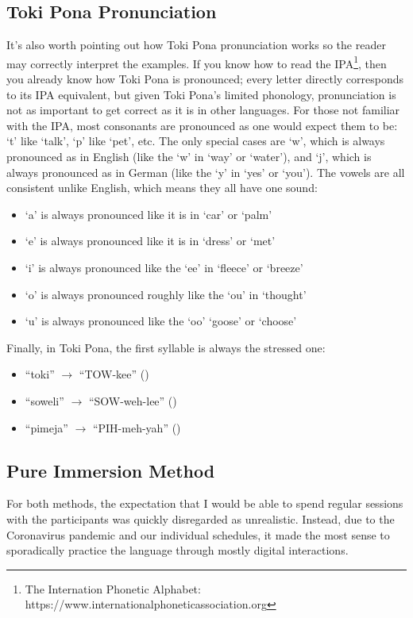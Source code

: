 \documentclass[a4paper,10pt]{article}
\begin{document}
\subsection{Toki Pona Pronunciation}
It's also worth pointing out how Toki Pona pronunciation works so the reader may correctly interpret
the examples. If you know how to read the IPA\footnote{The Internation Phonetic Alphabet:
https://www.internationalphoneticassociation.org}, then you
already know how Toki Pona is pronounced; every letter directly corresponds to its IPA equivalent,
but given Toki Pona's limited phonology, pronunciation is not as important to get correct as it is
in other languages. For those not familiar with the IPA, most consonants are pronounced as one
would expect them to be: `t' like `talk', `p' like `pet', etc. The only special cases are `w', which
is always pronounced as in English (like the `w' in `way' or `water'), and `j', which is always
pronounced as in German (like the `y' in `yes' or `you'). The vowels are all consistent unlike English,
which means they all have one sound:

\begin{itemize}
	\item `a' is always pronounced like it is in `car' or `palm'
	\item `e' is always pronounced like it is in `dress' or `met'
	\item `i' is always pronounced like the `ee' in `fleece' or `breeze'
	\item `o' is always pronounced roughly like the `ou' in `thought'
	\item `u' is always pronounced like the `oo' `goose' or `choose'
\end{itemize}

Finally, in Toki Pona, the first syllable is always the stressed one:

\begin{itemize}
	\item ``toki'' $\rightarrow$ ``TOW-kee'' ()
	\item ``soweli'' $\rightarrow$ ``SOW-weh-lee'' ()
	\item ``pimeja'' $\rightarrow$ ``PIH-meh-yah'' ()
\end{itemize}

\subsection{Pure Immersion Method}
For both methods, the expectation that I would be able to spend regular sessions with the participants
was quickly disregarded as unrealistic. Instead, due to the Coronavirus pandemic and our individual
schedules, it made the most sense to sporadically practice the language through mostly digital
interactions.
\end{document}
